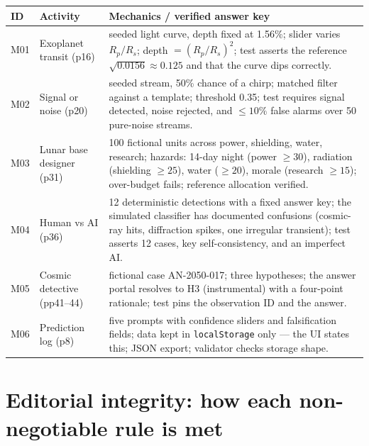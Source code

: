 \documentclass[11pt,a4paper]{article}
\newcommand{\code}[1]{\texttt{#1}}
\begin{document}
\begin{longtable}{p{12mm}p{38mm}p{96mm}}
\textbf{ID} & \textbf{Activity} & \textbf{Mechanics / verified answer key}\\
\endhead
M01 & Exoplanet transit (p16) & seeded light curve, depth fixed at 1.56\%;
slider varies $R_p/R_s$; depth $=(R_p/R_s)^2$; test asserts the reference
$\sqrt{0.0156}\approx0.125$ and that the curve dips correctly.\\
M02 & Signal or noise (p20) & seeded stream, 50\% chance of a chirp; matched
filter against a template; threshold 0.35; test requires signal detected,
noise rejected, and $\le 10\%$ false alarms over 50 pure-noise streams.\\
M03 & Lunar base designer (p31) & 100 fictional units across power, shielding,
water, research; hazards: 14-day night (power $\ge 30$), radiation (shielding
$\ge 25$), water ($\ge 20$), morale (research $\ge 15$); over-budget fails;
reference allocation verified.\\
M04 & Human vs AI (p36) & 12 deterministic detections with a fixed answer
key; the simulated classifier has documented confusions (cosmic-ray hits,
diffraction spikes, one irregular transient); test asserts 12 cases, key
self-consistency, and an imperfect AI.\\
M05 & Cosmic detective (pp41--44) & fictional case AN-2050-017; three
hypotheses; the answer portal resolves to H3 (instrumental) with a
four-point rationale; test pins the observation ID and the answer.\\
M06 & Prediction log (p8) & five prompts with confidence sliders and
falsification fields; data kept in \code{localStorage} only --- the UI states
this; JSON export; validator checks storage shape.\\
\end{longtable}

\section{Editorial integrity: how each non-negotiable rule is met}
\end{document}
